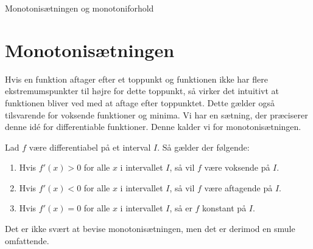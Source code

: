 
\begin{center}
\Huge
Monotonisætningen og monotoniforhold
\end{center}
\section*{Monotonisætningen}
Hvis en funktion aftager efter et toppunkt og funktionen ikke har flere ekstremumspunkter til højre for dette toppunkt, så virker det intuitivt at funktionen bliver ved med at aftage efter toppunktet. Dette gælder også tilsvarende for voksende funktioner og minima. Vi har en sætning, der præciserer denne idé for differentiable funktioner. Denne kalder vi for monotonisætningen. 
\begin{setn}[Monotonisætningen]
Lad $f$ være differentiabel på et interval $I$. Så gælder der følgende:
\begin{enumerate}[label=\roman*)]
\item Hvis $f'(x)>0$ for alle $x$ i intervallet $I$, så vil $f$ være voksende på $I$.
\item Hvis $f'(x)<0$ for alle $x$ i intervallet $I$, så vil $f$ være aftagende på $I$. 
\item Hvis $f'(x)=0$ for alle $x$ i intervallet $I$, så er $f$ konstant på $I$.
\end{enumerate}
\end{setn}
Det er ikke svært at bevise monotonisætningen, men det er derimod en smule omfattende. 

